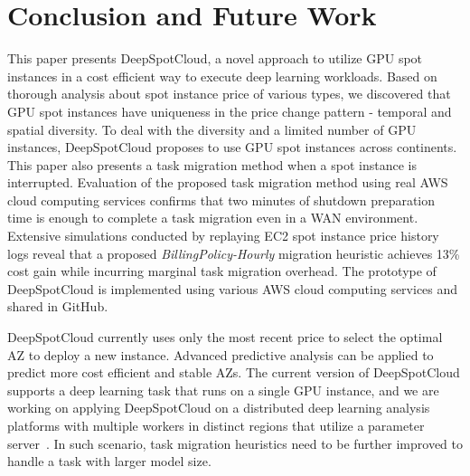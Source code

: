 \documentclass[conference]{IEEEtran}
\begin{document}
\section{Conclusion and Future Work}
This paper presents DeepSpotCloud, a novel approach to utilize GPU spot instances in a cost efficient way to execute deep learning workloads. Based on thorough analysis about spot instance price of various types, we discovered that GPU spot instances have uniqueness in the price change pattern - temporal and spatial diversity. To deal with the diversity and a limited number of GPU instances, DeepSpotCloud proposes to use GPU spot instances across continents. This paper also presents a task migration method when a spot instance is interrupted. Evaluation of the proposed task migration method using real AWS cloud computing services confirms that two minutes of shutdown preparation time is enough to complete a task migration even in a WAN environment. Extensive simulations conducted by replaying EC2 spot instance price history logs reveal that a proposed \textit{BillingPolicy-Hourly} migration heuristic achieves 13\% cost gain while incurring marginal task migration overhead. The prototype of DeepSpotCloud is implemented using various AWS cloud computing services and shared in GitHub.

DeepSpotCloud currently uses only the most recent price to select the optimal AZ to deploy a new instance. Advanced predictive analysis can be applied to predict more cost efficient and stable AZs. The current version of DeepSpotCloud supports a deep learning task that runs on a single GPU instance, and we are working on applying DeepSpotCloud on a distributed deep learning analysis platforms with multiple workers in distinct regions that utilize a parameter server~\cite{parameter-server}. In such scenario, task migration heuristics need to be further improved to handle a task with larger model size. 

\end{document}
